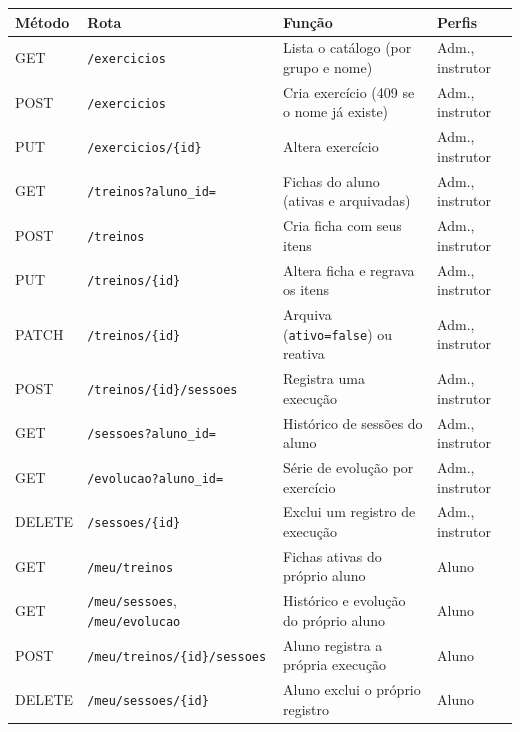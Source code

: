 \documentclass[11pt,a4paper,final]{article}
\newcommand{\cod}[1]{\texttt{#1}}
\begin{document}
\begin{xltabular}{\textwidth}{l l Y R{3.2cm}}
  \toprule
  \textbf{Método} & \textbf{Rota} & \textbf{Função} & \textbf{Perfis} \\
  \midrule
  \endhead
  GET  & \cod{/exercicios}                 & Lista o catálogo (por grupo e nome)            & Adm., instrutor \\
  POST & \cod{/exercicios}                 & Cria exercício (409 se o nome já existe)       & Adm., instrutor \\
  PUT  & \cod{/exercicios/\{id\}}          & Altera exercício                                & Adm., instrutor \\
  GET  & \cod{/treinos?aluno\_id=}         & Fichas do aluno (ativas e arquivadas)           & Adm., instrutor \\
  POST & \cod{/treinos}                    & Cria ficha com seus itens                       & Adm., instrutor \\
  PUT  & \cod{/treinos/\{id\}}             & Altera ficha e regrava os itens                 & Adm., instrutor \\
  PATCH & \cod{/treinos/\{id\}}            & Arquiva (\cod{ativo=false}) ou reativa          & Adm., instrutor \\
  POST & \cod{/treinos/\{id\}/sessoes}     & Registra uma execução                           & Adm., instrutor \\
  GET  & \cod{/sessoes?aluno\_id=}         & Histórico de sessões do aluno                   & Adm., instrutor \\
  GET  & \cod{/evolucao?aluno\_id=}        & Série de evolução por exercício                 & Adm., instrutor \\
  DELETE & \cod{/sessoes/\{id\}}           & Exclui um registro de execução                  & Adm., instrutor \\
  GET  & \cod{/meu/treinos}                & Fichas ativas do próprio aluno                  & Aluno \\
  GET  & \cod{/meu/sessoes}, \cod{/meu/evolucao} & Histórico e evolução do próprio aluno    & Aluno \\
  POST & \cod{/meu/treinos/\{id\}/sessoes} & Aluno registra a própria execução               & Aluno \\
  DELETE & \cod{/meu/sessoes/\{id\}}       & Aluno exclui o próprio registro                 & Aluno \\
  \bottomrule
\end{xltabular}
\end{document}
